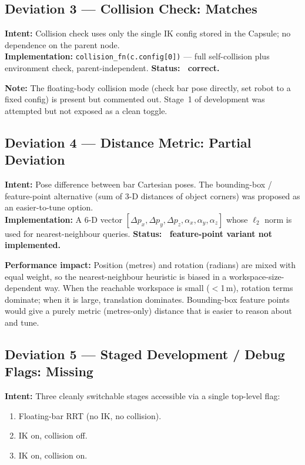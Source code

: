 \documentclass[11pt]{article}
\begin{document}
\subsection*{Deviation 3 — Collision Check: Matches \checkmark}

\textbf{Intent:} Collision check uses only the single IK config stored in the Capsule;
no dependence on the parent node.\\
\textbf{Implementation:} \texttt{collision\_fn(c.config[0])} — full self-collision
plus environment check, parent-independent. \textbf{Status: \checkmark~correct.}

\noindent\textbf{Note:} The floating-body collision mode (check bar pose directly, set robot
to a fixed config) is present but commented out.  Stage~1 of development was
attempted but not exposed as a clean toggle.

\subsection*{Deviation 4 — Distance Metric: Partial Deviation}

\textbf{Intent:} Pose difference between bar Cartesian poses.
The bounding-box / feature-point alternative (sum of 3-D distances of object corners)
was proposed as an easier-to-tune option.\\
\textbf{Implementation:} A 6-D vector
$[\Delta p_x,\Delta p_y,\Delta p_z,\alpha_x,\alpha_y,\alpha_z]$ whose $\ell_2$ norm
is used for nearest-neighbour queries. \textbf{Status: \texttimes~feature-point variant not implemented.}

\noindent\textbf{Performance impact:} Position (metres) and rotation (radians) are mixed with
equal weight, so the nearest-neighbour heuristic is biased in a workspace-size-dependent
way. When the reachable workspace is small ($<$1\,m), rotation terms dominate; when it
is large, translation dominates. Bounding-box feature points would give a purely metric
(metres-only) distance that is easier to reason about and tune.

\subsection*{Deviation 5 — Staged Development / Debug Flags: Missing}

\textbf{Intent:} Three cleanly switchable stages accessible via a single top-level flag:
\begin{enumerate}
  \item Floating-bar RRT (no IK, no collision).
  \item IK on, collision off.
  \item IK on, collision on.
\end{enumerate}
\end{document}
